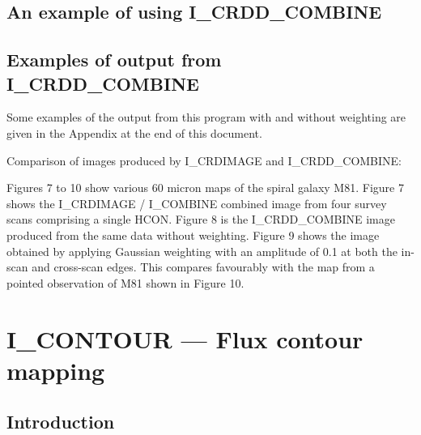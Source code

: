 \documentclass[nolof,noabs,11pt]{starlink}
\begin{document}
\subsection{An example of using I\_CRDD\_COMBINE}


\subsection{Examples of output from I\_CRDD\_COMBINE}

   Some examples of the output from this program with and without weighting
are given in the Appendix at the end of this document.

Comparison of images produced by I\_CRDIMAGE and I\_CRDD\_COMBINE:

Figures 7 to 10 show various 60 micron maps of the spiral galaxy M81.
Figure 7 shows the I\_CRDIMAGE / I\_COMBINE combined image from four survey
scans comprising a single HCON.
Figure 8 is the I\_CRDD\_COMBINE image produced from the same data without
weighting.
Figure 9 shows the image obtained by applying Gaussian weighting with an
amplitude of 0.1 at both the in-scan and cross-scan edges.
This compares favourably with the map from a pointed observation of M81 shown in
Figure 10.

\pagebreak

\section{I\_CONTOUR --- Flux contour mapping}

\subsection {Introduction}
\end{document}
